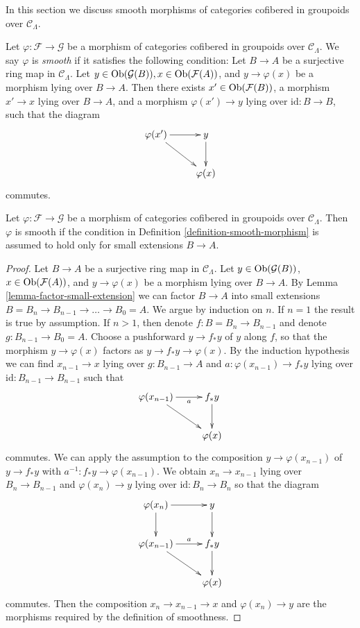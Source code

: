 \noindent
In this section we discuss smooth morphisms of categories
cofibered in groupoids over $\mathcal{C}_\Lambda$.

\begin{definition}
\label{definition-smooth-morphism}
Let $\varphi: \mathcal{F} \to \mathcal{G}$ be a morphism of categories
cofibered in groupoids over $\mathcal{C}_\Lambda$.  We say  $\varphi$ is
{\it smooth} if it satisfies the following condition: Let $B \to A$ be
a surjective ring map in $\mathcal{C}_\Lambda$.  Let $y \in
\mathop{\rm Ob}\nolimits(\mathcal{G}(B)), x \in \mathop{\rm Ob}\nolimits(\mathcal{F}(A))$, and $y
\to \varphi(x)$ be a morphism lying over $B \to A$.  Then there
exists $x' \in \mathop{\rm Ob}\nolimits(\mathcal{F}(B))$, a morphism $x' \to x$
lying over $B \to A$, and a morphism $\varphi(x') \to y$ lying
over $\text{id}: B \to B$, such that the diagram
$$
\xymatrix{
\varphi(x') \ar[r] \ar[dr] & y \ar[d] \\
& \varphi(x)
}
$$
commutes.
\end{definition}

\begin{lemma}
\label{lemma-smoothness-small-extensions}
Let $\varphi: \mathcal{F} \to \mathcal{G}$ be a morphism of categories
cofibered in groupoids over $\mathcal{C}_\Lambda$.  Then $\varphi$ is smooth
if the condition in Definition \ref{definition-smooth-morphism} is assumed to
hold only for small extensions $B \to A$.
\end{lemma}

\begin{proof}
Let $B \to A$ be a surjective ring map in $\mathcal{C}_\Lambda$.
Let $y \in \mathop{\rm Ob}\nolimits(\mathcal{G}(B))$, $x \in \mathop{\rm Ob}\nolimits(\mathcal{F}(A))$,
and $y \to \varphi(x)$ be a morphism lying over $B \to A$. By
Lemma \ref{lemma-factor-small-extension} we can factor $B \to A$ into
small extensions $B = B_n \to B_{n-1} \to \ldots \to B_0 = A$.
We argue by induction on $n$. If $n = 1$ the result is true by assumption.
If $n > 1$, then denote $f : B = B_n \to B_{n - 1}$ and denote
$g : B_{n - 1} \to B_0 = A$. Choose a pushforward
$y \to f_* y$ of $y$ along $f$, so that the morphism $y \to \varphi(x)$
factors as $y \to f_* y \to \varphi(x)$. By the induction hypothesis
we can find $x_{n - 1} \to x$ lying over $g : B_{n - 1} \to A$ and
$a : \varphi(x_{n - 1}) \to f_*y$ lying over
$\text{id} : B_{n - 1} \to B_{n - 1}$ such that
$$
\xymatrix{
\varphi(x_{n - 1}) \ar[r]_-a \ar[dr] & f_*y \ar[d] \\
& \varphi(x)
}
$$
commutes. We can apply the assumption to the composition
$y \to \varphi(x_{n - 1})$ of
$y \to f_*y$ with $a^{-1} : f_*y \to \varphi(x_{n - 1})$. We obtain
$x_n \to x_{n - 1}$ lying over $B_n \to B_{n - 1}$ and
$\varphi(x_n) \to y$ lying over  $\text{id} : B_n \to B_n$ so that the diagram
$$
\xymatrix{
\varphi(x_n) \ar[r] \ar[d] & y \ar[d] \\
\varphi(x_{n - 1}) \ar[r]^-a \ar[dr] & f_*y \ar[d] \\
& \varphi(x)
}
$$
commutes. Then the composition $x_n \to x_{n - 1} \to x$ and
$\varphi(x_n) \to y$ are the morphisms required by the definition of
smoothness.
\end{proof}

